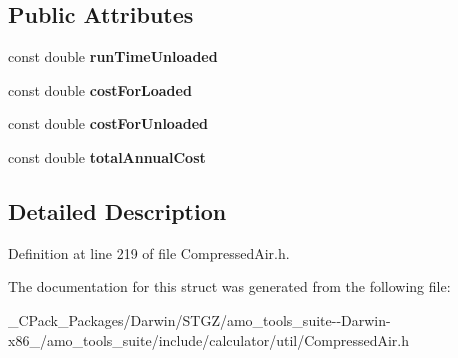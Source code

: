 \subsection*{Public Attributes}
\begin{DoxyCompactItemize}
\item 
\mbox{\label{struct_compressor_1_1_operating_cost_1_1_output_ae13051fb802def8fc6e18209db38b5aa}} 
const double {\bfseries run\+Time\+Unloaded}
\item 
\mbox{\label{struct_compressor_1_1_operating_cost_1_1_output_a4c65ee9ba069d432cf837f42a4702121}} 
const double {\bfseries cost\+For\+Loaded}
\item 
\mbox{\label{struct_compressor_1_1_operating_cost_1_1_output_a0e307a677ed5dbf7dba5b061cf5bfccf}} 
const double {\bfseries cost\+For\+Unloaded}
\item 
\mbox{\label{struct_compressor_1_1_operating_cost_1_1_output_a245a4b7baeb985a60d11b65f866563f0}} 
const double {\bfseries total\+Annual\+Cost}
\end{DoxyCompactItemize}


\subsection{Detailed Description}


Definition at line 219 of file Compressed\+Air.\+h.



The documentation for this struct was generated from the following file\+:\begin{DoxyCompactItemize}
\item 
\+\_\+\+C\+Pack\+\_\+\+Packages/\+Darwin/\+S\+T\+G\+Z/amo\+\_\+tools\+\_\+suite-\/-\/\+Darwin-\/x86\+\_/amo\+\_\+tools\+\_\+suite/include/calculator/util/Compressed\+Air.\+h\end{DoxyCompactItemize}
